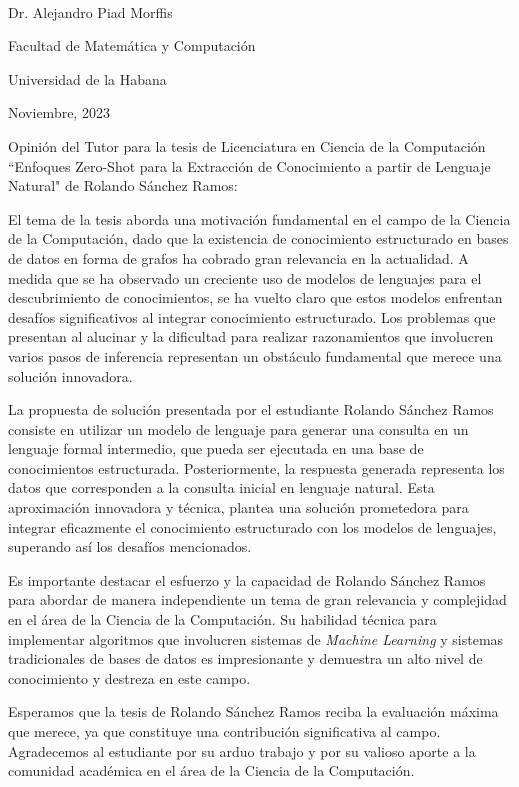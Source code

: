 \begin{opinion}	
	

\vspace{1cm}


\begin{flushright}
	\underline{\hspace{6.5cm}}\\
	Dr. Alejandro Piad Morffis
	
	Facultad de Matemática y Computación
	
	Universidad de la Habana
	
	Noviembre, 2023
\end{flushright}

Opinión del Tutor para la tesis de Licenciatura en Ciencia de la Computación ``Enfoques Zero-Shot para la Extracción de Conocimiento a partir de Lenguaje Natural" de Rolando Sánchez Ramos:

El tema de la tesis aborda una motivación fundamental en el campo de la Ciencia de la Computación, dado que la existencia de conocimiento estructurado en bases de datos en forma de grafos ha cobrado gran relevancia en la actualidad. A medida que se ha observado un creciente uso de modelos de lenguajes para el descubrimiento de conocimientos, se ha vuelto claro que estos modelos enfrentan desafíos significativos al integrar conocimiento estructurado. Los problemas que presentan al alucinar y la dificultad para realizar razonamientos que involucren varios pasos de inferencia representan un obstáculo fundamental que merece una solución innovadora.

La propuesta de solución presentada por el estudiante Rolando Sánchez Ramos consiste en utilizar un modelo de lenguaje para generar una consulta en un lenguaje formal intermedio, que pueda ser ejecutada en una base de conocimientos estructurada. Posteriormente, la respuesta generada representa los datos que corresponden a la consulta inicial en lenguaje natural. Esta aproximación innovadora y técnica, plantea una solución prometedora para integrar eficazmente el conocimiento estructurado con los modelos de lenguajes, superando así los desafíos mencionados.

Es importante destacar el esfuerzo y la capacidad de Rolando Sánchez Ramos para abordar de manera independiente un tema de gran relevancia y complejidad en el área de la Ciencia de la Computación. Su habilidad técnica para implementar algoritmos que involucren sistemas de \textit{Machine Learning} y sistemas tradicionales de bases de datos es impresionante y demuestra un alto nivel de conocimiento y destreza en este campo.

Esperamos que la tesis de Rolando Sánchez Ramos reciba la evaluación máxima que merece, ya que constituye una contribución significativa al campo. Agradecemos al estudiante por su arduo trabajo y por su valioso aporte a la comunidad académica en el área de la Ciencia de la Computación.

\end{opinion}